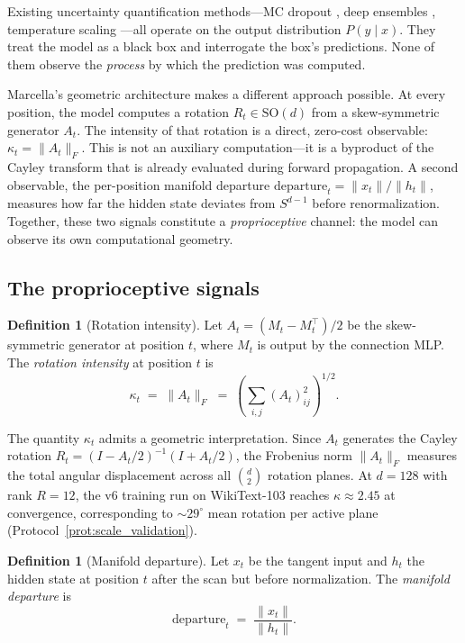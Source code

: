 \documentclass[11pt,a4paper]{article}
\theoremstyle{definition}
\newtheorem{definition}[theorem]{Definition}
\theoremstyle{remark}
\newcommand{\SO}{\mathrm{SO}}
\begin{document}
Existing uncertainty quantification methods---MC dropout 
\cite{gal2016dropout}, deep ensembles \cite{lakshminarayanan2017simple}, 
temperature scaling \cite{guo2017calibration}---all operate on the 
output distribution $P(y \mid x)$. They treat the model as a black 
box and interrogate the box's predictions. None of them observe the 
\emph{process} by which the prediction was computed.

Marcella's geometric architecture makes a different approach possible. 
At every position, the model computes a rotation $R_t \in \SO(d)$ 
from a skew-symmetric generator $A_t$. The intensity of that rotation 
is a direct, zero-cost observable: $\kappa_t = \|A_t\|_F$. This is 
not an auxiliary computation---it is a byproduct of the Cayley 
transform that is already evaluated during forward propagation. A 
second observable, the per-position manifold departure 
$\mathrm{departure}_t = \|x_t\| / \|h_t\|$, measures how far the 
hidden state deviates from $S^{d-1}$ before renormalization. Together, 
these two signals constitute a \emph{proprioceptive} channel: the 
model can observe its own computational geometry.

\subsection{The proprioceptive signals}\label{sec:proprio_signals}

\begin{definition}[Rotation intensity]\label{def:kappa}
Let $A_t = (M_t - M_t^\top)/2$ be the skew-symmetric generator 
at position $t$, where $M_t$ is output by the connection MLP. The 
\emph{rotation intensity} at position $t$ is
\begin{equation}\label{eq:kappa}
    \kappa_t \;=\; \|A_t\|_F \;=\; 
    \left(\sum_{i,j} (A_t)_{ij}^2\right)^{1/2}.
\end{equation}
\end{definition}

The quantity $\kappa_t$ admits a geometric interpretation. Since $A_t$ 
generates the Cayley rotation $R_t = (I - A_t/2)^{-1}(I + A_t/2)$, 
the Frobenius norm $\|A_t\|_F$ measures the total angular displacement 
across all $\binom{d}{2}$ rotation planes. At $d = 128$ with rank 
$R = 12$, the v6 training run on WikiText-103 reaches $\kappa \approx 
2.45$ at convergence, corresponding to ${\sim}29^\circ$ mean rotation 
per active plane (Protocol~\ref{prot:scale_validation}).

\begin{definition}[Manifold departure]\label{def:departure}
Let $x_t$ be the tangent input and $h_t$ the hidden state at 
position $t$ after the scan but before normalization. The 
\emph{manifold departure} is
\begin{equation}\label{eq:departure}
    \mathrm{departure}_t \;=\; \frac{\|x_t\|}{\|h_t\|}.
\end{equation}
\end{definition}
\end{document}
